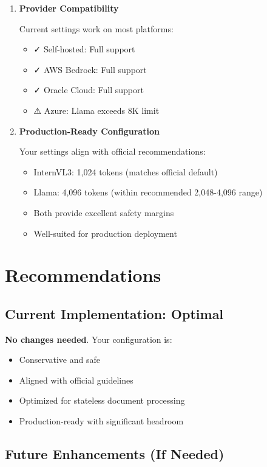 \documentclass[11pt,a4paper]{article}
\newcommand{\cmark}{\textcolor{green!70!black}{✓}}
\begin{document}
\begin{enumerate}[leftmargin=*]
    \item \textbf{Provider Compatibility}

    Current settings work on most platforms:
    \begin{itemize}
        \item \cmark{} Self-hosted: Full support
        \item \cmark{} AWS Bedrock: Full support
        \item \cmark{} Oracle Cloud: Full support
        \item ⚠ Azure: Llama exceeds 8K limit
    \end{itemize}

    \item \textbf{Production-Ready Configuration}

    Your settings align with official recommendations:
    \begin{itemize}
        \item InternVL3: 1,024 tokens (matches official default)
        \item Llama: 4,096 tokens (within recommended 2,048-4,096 range)
        \item Both provide excellent safety margins
        \item Well-suited for production deployment
    \end{itemize}
\end{enumerate}

\section{Recommendations}

\subsection{Current Implementation: Optimal}

\textbf{No changes needed}. Your configuration is:
\begin{itemize}[leftmargin=*]
    \item Conservative and safe
    \item Aligned with official guidelines
    \item Optimized for stateless document processing
    \item Production-ready with significant headroom
\end{itemize}

\subsection{Future Enhancements (If Needed)}
\end{document}
